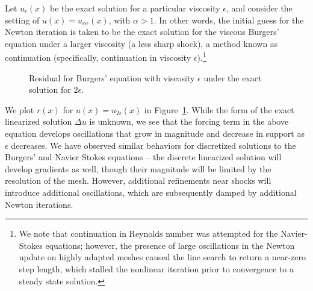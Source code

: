 Let $u_\epsilon(x)$ be the exact solution for a particular viscosity $\epsilon$, and consider the setting of $u(x) = u_{\alpha \epsilon}(x)$, with $\alpha > 1$.  In other words, the initial guess for the Newton iteration is taken to be the exact solution for the viscous Burgers' equation under a larger viscosity (a less sharp shock), a method known as continuation (specifically, continuation in viscosity $\epsilon$).\footnote{We note that continuation in Reynolds number was attempted for the Navier-Stokes equations; however, the presence of large oscillations in the Newton update on highly adapted meshes caused the line search to return a near-zero step length, which stalled the nonlinear iteration prior to convergence to a steady state solution.}

\begin{figure}
\centering
{}
\caption{Residual for Burgers' equation with viscosity $\epsilon$ under the exact solution for ${2\epsilon}$.}
\label{fig:burgersResidual}
\end{figure} 

We plot $r(x)$ for $u(x) = u_{2\epsilon}(x)$ in Figure~\ref{fig:burgersResidual}.  While the form of the exact linearized solution $\Delta u$ is unknown, we see that the forcing term in the above equation develops oscillations that grow in magnitude and decrease in support as $\epsilon$ decreases.  We have observed similar behaviors for discretized solutions to the Burgers' and Navier Stokes equations -- the discrete linearized solution will develop gradients as well, though their magnitude will be limited by the resolution of the mesh.  However, additional refinements near shocks will introduce additional oscillations, which are subsequently damped by additional Newton iterations.  

